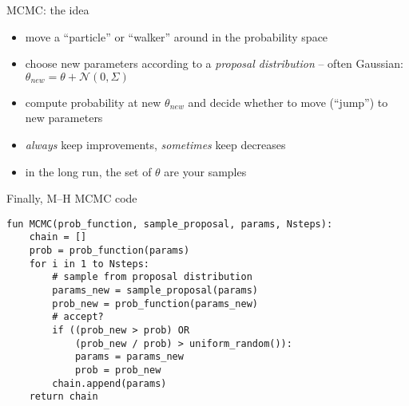 \documentclass[compress,t]{beamer}
\begin{document}
\begin{frame}{MCMC: the idea}
  \begin{itemize}
  \item move a ``particle'' or ``walker'' around in the probability space
  \item choose new parameters according to a \emph{proposal distribution}
    -- often Gaussian: $\theta_{new} = \theta + \mathcal{N}(0, \Sigma)$
  \item compute probability at new $\theta_{new}$ and decide whether to move (``jump'') to new parameters
  \item \emph{always} keep improvements, \emph{sometimes} keep decreases
  \item in the long run, the set of $\theta$ are your samples
  \end{itemize}
\end{frame}

\begin{frame}[fragile]{Finally, M--H MCMC code}
\begin{verbatim}
fun MCMC(prob_function, sample_proposal, params, Nsteps):
    chain = []
    prob = prob_function(params)
    for i in 1 to Nsteps:
        # sample from proposal distribution
        params_new = sample_proposal(params)
        prob_new = prob_function(params_new)
        # accept?
        if ((prob_new > prob) OR
            (prob_new / prob) > uniform_random()):
            params = params_new
            prob = prob_new
        chain.append(params)
    return chain
\end{verbatim}
\end{frame}
\end{document}
